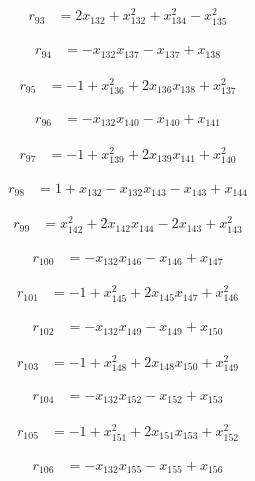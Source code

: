\begin{align*}
r_{93}&=2x_{132}+x_{132}^{2}+x_{134}^{2}-x_{135}^{2}
\end{align*}

\begin{align*}
r_{94}&=-x_{132}x_{137}-x_{137}+x_{138}
\end{align*}

\begin{align*}
r_{95}&=-1+x_{136}^{2}+2x_{136}x_{138}+x_{137}^{2}
\end{align*}

\begin{align*}
r_{96}&=-x_{132}x_{140}-x_{140}+x_{141}
\end{align*}

\begin{align*}
r_{97}&=-1+x_{139}^{2}+2x_{139}x_{141}+x_{140}^{2}
\end{align*}

\begin{align*}
r_{98}&=1+x_{132}-x_{132}x_{143}-x_{143}+x_{144}
\end{align*}

\begin{align*}
r_{99}&=x_{142}^{2}+2x_{142}x_{144}-2x_{143}+x_{143}^{2}
\end{align*}

\begin{align*}
r_{100}&=-x_{132}x_{146}-x_{146}+x_{147}
\end{align*}

\begin{align*}
r_{101}&=-1+x_{145}^{2}+2x_{145}x_{147}+x_{146}^{2}
\end{align*}

\begin{align*}
r_{102}&=-x_{132}x_{149}-x_{149}+x_{150}
\end{align*}

\begin{align*}
r_{103}&=-1+x_{148}^{2}+2x_{148}x_{150}+x_{149}^{2}
\end{align*}

\begin{align*}
r_{104}&=-x_{132}x_{152}-x_{152}+x_{153}
\end{align*}

\begin{align*}
r_{105}&=-1+x_{151}^{2}+2x_{151}x_{153}+x_{152}^{2}
\end{align*}

\begin{align*}
r_{106}&=-x_{132}x_{155}-x_{155}+x_{156}
\end{align*}

